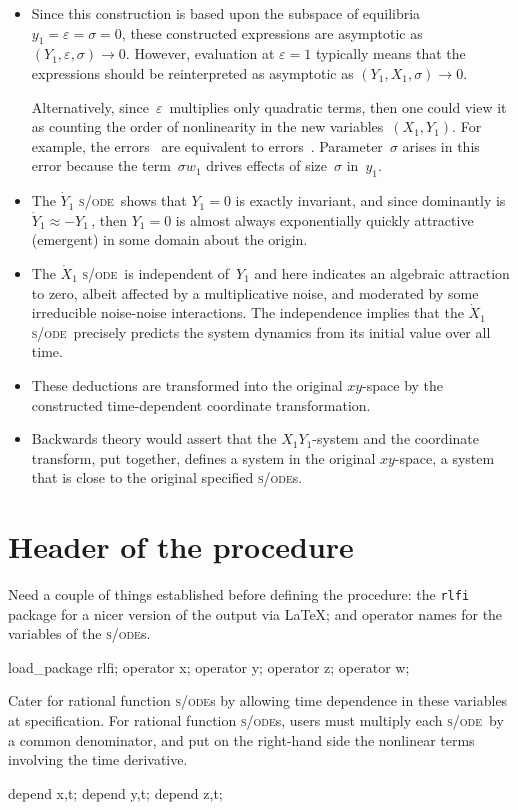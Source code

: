 \documentclass[11pt,a5paper]{article}
\def\eps{\ensuremath{\varepsilon}}
\def\sde{\textsc{s/ode}}
\begin{document}
\begin{itemize}
\item Since this construction is based upon the subspace of
equilibria \(y_1=\eps=\sigma=0\), these constructed
expressions are asymptotic as \((Y_1,\eps,\sigma)\to0\). 
However, evaluation at \(\eps=1\) typically means that the
expressions should be reinterpreted as asymptotic  as
\((Y_1,X_1,\sigma)\to0\).

Alternatively, since~\eps\ multiplies only quadratic terms, 
then one could view it as counting the order of 
nonlinearity in the new variables~\((X_1,Y_1)\).  For 
example, the errors~\Ord{\eps^3} are equivalent to 
errors~.  Parameter~\(\sigma\) 
arises in this error because the term~\(\sigma w_1\) drives 
effects of size~\(\sigma\) in~\(y_1\).

\item The \(\dot Y_1\) \sde\ shows that \(Y_1=0\) is exactly
invariant, and since dominantly is \(\dot Y_1 \approx
-Y_1\)\,, then \(Y_1=0\) is almost always exponentially
quickly attractive (emergent) in some domain about the
origin.

\item The \(\dot X_1\) \sde\ is independent of~\(Y_1\) and
here indicates an algebraic attraction to zero, albeit
affected by a multiplicative noise, and moderated by some
irreducible noise-noise interactions.  The independence
implies that the \(\dot X_1\) \sde\ precisely predicts the
system dynamics from its initial value over all time.

\item These deductions are transformed into the original
\(xy\)-space by the constructed time-dependent coordinate
transformation.

\item Backwards theory \cite[]{Roberts2018a} would assert
that the \(X_1Y_1\)-system and the coordinate transform, put
together, defines a system in the original \(xy\)-space, a
system that is close to the original specified \sde{}s.
\end{itemize}




\section{Header of the procedure}

Need a couple of things established before defining the
procedure: the \verb|rlfi| package for a nicer version of
the output via \LaTeX; and operator names for the variables
of the \sde{}s.
\begin{reduce}
load_package rlfi; 
operator x;
operator y;
operator z;
operator w;
\end{reduce}
Cater for rational function \sde{}s by allowing time
dependence in these variables at specification. For rational
function \sde{}s, users must multiply each \sde\ by a common
denominator, and put on the right-hand side the nonlinear
terms involving the time derivative.
\begin{reduce}
depend x,t;
depend y,t;
depend z,t;
\end{reduce}
\end{document}
